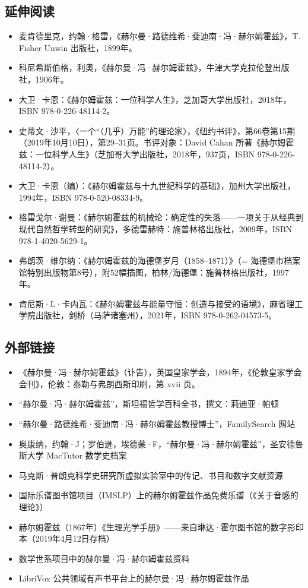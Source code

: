 \subsection{延伸阅读}
\begin{itemize}
\item 麦肯德里克，约翰·格雷，《赫尔曼·路德维希·斐迪南·冯·赫尔姆霍兹》，T. Fisher Unwin 出版社，1899年。
\item 科尼希斯伯格，利奥，《赫尔曼·冯·赫尔姆霍兹》，牛津大学克拉伦登出版社，1906年。
\item 大卫·卡恩：《赫尔姆霍兹：一位科学人生》，芝加哥大学出版社，2018年，ISBN 978-0-226-48114-2。
\item 史蒂文·沙平，〈一个“（几乎）万能”的理论家〉，《纽约书评》，第66卷第15期（2019年10月10日），第29–31页。书评对象：David Cahan 所著《赫尔姆霍兹：一位科学人生》（芝加哥大学出版社，2018年，937页，ISBN 978-0-226-48114-2）。
\item 大卫·卡恩（编）：《赫尔姆霍兹与十九世纪科学的基础》，加州大学出版社，1994年，ISBN 978-0-520-08334-9。
\item 格雷戈尔·谢曼：《赫尔姆霍兹的机械论：确定性的失落——一项关于从经典到现代自然哲学转型的研究》，多德雷赫特：施普林格出版社，2009年，ISBN 978-1-4020-5629-1。
\item 弗朗茨·维尔纳：《赫尔姆霍兹的海德堡岁月（1858–1871）》（= 海德堡市档案馆特别出版物第8号），附52幅插图，柏林/海德堡：施普林格出版社，1997年。
\item 肯尼斯·L·卡内瓦：《赫尔姆霍兹与能量守恒：创造与接受的语境》，麻省理工学院出版社，剑桥（马萨诸塞州），2021年，ISBN 978-0-262-04573-5。
\end{itemize}
\subsection{外部链接}
\begin{itemize}
\item 《赫尔曼·冯·赫尔姆霍兹》（讣告），英国皇家学会，1894年，《伦敦皇家学会会刊》，伦敦：泰勒与弗朗西斯印刷，第 xvii 页。
\item “赫尔曼·冯·赫尔姆霍兹”，斯坦福哲学百科全书，撰文：莉迪亚·帕顿
\item “赫尔曼·路德维希·斐迪南·冯·赫尔姆霍兹教授博士”，FamilySearch 网站
\item 奥康纳，约翰·J；罗伯逊，埃德蒙·F，“赫尔曼·冯·赫尔姆霍兹”，圣安德鲁斯大学 MacTutor 数学史档案
\item 马克斯·普朗克科学史研究所虚拟实验室中的传记、书目和数字文献资源
\item 国际乐谱图书馆项目（IMSLP）上的赫尔姆霍兹作品免费乐谱（《关于音感的理论》）
\item 赫尔姆霍兹（1867年）《生理光学手册》——来自琳达·霍尔图书馆的数字影印本（2019年4月12日存档）
\item 数学世系项目中的赫尔曼·冯·赫尔姆霍兹资料
\item LibriVox 公共领域有声书平台上的赫尔曼·冯·赫尔姆霍兹作品
\end{itemize}
